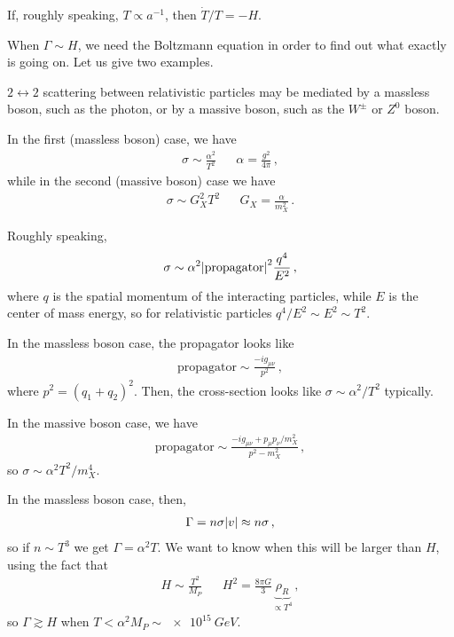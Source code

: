 \documentclass[main.tex]{subfiles}
\begin{document}
If, roughly speaking, \(T \propto a^{-1}\), then \(\dot{T} / T = - H\). 

When \(\Gamma \sim H\), we need the Boltzmann equation in order to find out what exactly is going on. 
Let us give two examples. 

\(2 \leftrightarrow 2\) scattering between relativistic particles may be mediated by a massless boson, such as the photon, or by a massive boson, such as the \(W^{\pm}\) or \(Z^{0}\) boson. 

In the first (massless boson) case, we have 
%
\begin{align}
\sigma \sim \frac{\alpha^2}{T^2} && \alpha = \frac{g^2}{4 \pi }
\,,
\end{align}
%
while in the second (massive boson) case we have 
%
\begin{align}
\sigma \sim G_X^2 T^2 && G_X = \frac{\alpha }{m_X^2}
\,.
\end{align}

Roughly speaking, 
%
\begin{align}
\sigma \sim \alpha^2\abs{\text{propagator}}^2 \frac{q^{4}}{E^2}
\,,
\end{align}
%
where \(q\) is the spatial momentum of the interacting particles, while \(E\) is the center of mass energy, so for relativistic particles \(q^{4}/ E^2 \sim E^2 \sim T^2\).

In the massless boson case, the propagator looks like 
%
\begin{align}
\text{propagator} \sim \frac{-i g_{\mu \nu }}{p^2}
\,,
\end{align}
%
where \(p^2 =(q_1 + q_2 )^2\). 
Then, the cross-section looks like \(\sigma \sim \alpha^2 / T^2\) typically. 

In the massive boson case, we have 
%
\begin{align}
\text{propagator} \sim \frac{- i g_{\mu \nu } + p_{\mu } p_{\nu } / m_X^2}{p^2-  m_X^2}
\,,
\end{align}
%
so \(\sigma \sim \alpha^2 T^2 / m_X^{4}\). 

In the massless boson case, then, 
%
\begin{align}
\Gamma = n \sigma \abs{v} \approx n \sigma 
\,,
\end{align}
%
so if \(n \sim T^3\) we get \(\Gamma = \alpha^2 T\). We want to know when this will be larger than \(H\), using the fact that 
%
\begin{align}
H \sim \frac{T^2}{M_P} && H^2 = \frac{8 \pi G}{3} \underbrace{\rho _R}_{\propto T^{4}}
\,,
\end{align}
%
so \(\Gamma \gtrsim H\) when \(T < \alpha^2 M_P \sim \SI{e15}{GeV}\). 
\end{document}
